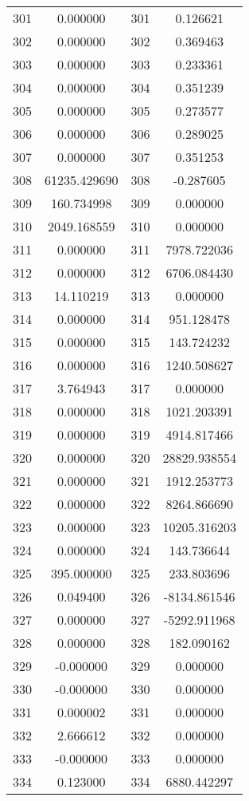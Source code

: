 \documentclass[12pt]{article}
\begin{document}
\begin{longtable}{@{}cccc@{}}
301 & 0.000000 & 301 & 0.126621 \\
302 & 0.000000 & 302 & 0.369463 \\
303 & 0.000000 & 303 & 0.233361 \\
304 & 0.000000 & 304 & 0.351239 \\
305 & 0.000000 & 305 & 0.273577 \\
306 & 0.000000 & 306 & 0.289025 \\
307 & 0.000000 & 307 & 0.351253 \\
308 & 61235.429690 & 308 & -0.287605 \\
309 & 160.734998 & 309 & 0.000000 \\
310 & 2049.168559 & 310 & 0.000000 \\
311 & 0.000000 & 311 & 7978.722036 \\
312 & 0.000000 & 312 & 6706.084430 \\
313 & 14.110219 & 313 & 0.000000 \\
314 & 0.000000 & 314 & 951.128478 \\
315 & 0.000000 & 315 & 143.724232 \\
316 & 0.000000 & 316 & 1240.508627 \\
317 & 3.764943 & 317 & 0.000000 \\
318 & 0.000000 & 318 & 1021.203391 \\
319 & 0.000000 & 319 & 4914.817466 \\
320 & 0.000000 & 320 & 28829.938554 \\
321 & 0.000000 & 321 & 1912.253773 \\
322 & 0.000000 & 322 & 8264.866690 \\
323 & 0.000000 & 323 & 10205.316203 \\
324 & 0.000000 & 324 & 143.736644 \\
325 & 395.000000 & 325 & 233.803696 \\
326 & 0.049400 & 326 & -8134.861546 \\
327 & 0.000000 & 327 & -5292.911968 \\
328 & 0.000000 & 328 & 182.090162 \\
329 & -0.000000 & 329 & 0.000000 \\
330 & -0.000000 & 330 & 0.000000 \\
331 & 0.000002 & 331 & 0.000000 \\
332 & 2.666612 & 332 & 0.000000 \\
333 & -0.000000 & 333 & 0.000000 \\
334 & 0.123000 & 334 & 6880.442297 \\

\end{longtable}
\end{document}
